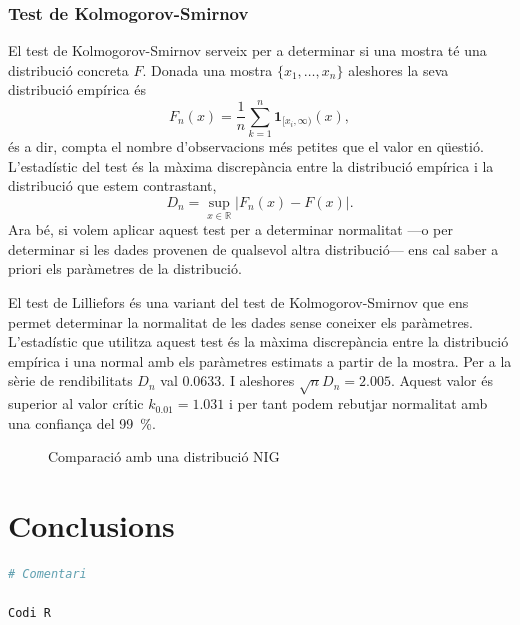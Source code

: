 \documentclass{article}
\numberwithin{table}{section}
\numberwithin{figure}{section}
\numberwithin{equation}{section}
\newcommand{\ind}{\ensuremath{\mathbf{1}}}
\newcommand{\R}{\ensuremath{\mathbb{R}}}
\newcommand{\abs}[1]{\ensuremath{\left\lvert #1 \right\rvert}}
\begin{document}
\subsubsection{Test de Kolmogorov-Smirnov}
El test de Kolmogorov-Smirnov serveix per a determinar si una mostra té una distribució concreta \( F \). Donada una mostra \( \{x_1, \dots, x_n \} \) aleshores la seva distribució empírica és
\begin{equation*}
	F_n(x) = \frac{1}{n} \sum_{k = 1}^{n} \ind_{[x_i, \infty)}(x),
\end{equation*}
és a dir, compta el nombre d'observacions més petites que el valor en qüestió. L'estadístic del test és la màxima discrepància entre la distribució empírica i la distribució que estem contrastant,
\begin{equation*}
	D_n = \sup_{x \in \R} \abs{F_n(x) - F(x)}.
\end{equation*}
Ara bé, si volem aplicar aquest test per a determinar normalitat ---o per determinar si les dades provenen de qualsevol altra distribució--- ens cal saber a priori els paràmetres de la distribució. 

El test de Lilliefors és una variant del test de Kolmogorov-Smirnov que ens permet determinar la normalitat de les dades sense coneixer els paràmetres. L'estadístic que utilitza aquest test és la màxima discrepància entre la distribució empírica i una normal amb els paràmetres estimats a partir de la mostra. Per a la sèrie de rendibilitats \( D_n \) val \num{0.0633}. I aleshores \( \sqrt{n}D_n = 2.005 \). Aquest valor és superior al valor crític \( k_{0.01} = 1.031 \) i per tant podem rebutjar normalitat amb una confiança del \SI{99}{\percent}.


\begin{figure}[H]
	\centering \sffamily \small
	
	\caption{Comparació amb una distribució NIG}
	\label{fig:comparacio nig}
\end{figure}


\section{Conclusions}
\newpage







\begin{lstlisting}[language=R]
# Comentari

Codi R
\end{lstlisting}

%
%
\printbibliography[heading = biblio]
\end{document}
